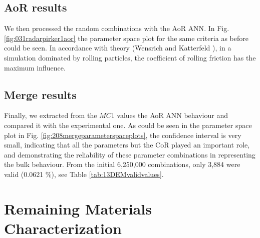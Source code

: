 % 
% 
% 
% 
% 

\subsection{AoR results}
\label{subsec:aorresults}

We then processed the random combinations with the \acs{AoR} \acs{ANN}. In Fig.
\ref{fig:031radarpirker1aor} the parameter space plot for the same criteria as
before could be seen.
In accordance with theory (Wensrich and Katterfeld \cite{RefWorks:87}), in a simulation dominated
by rolling particles, the coefficient of rolling friction has the maximum
influence. \\

% 

\subsection{Merge results}
\label{subsec:mergeresults}

Finally, we extracted from the $MC1$ values the \acs{AoR} \acs{ANN} behaviour
and compared it with the experimental one.
As could be seen in the parameter space plot in Fig.
\ref{fig:208mergeparameterspaceplots}, the confidence interval is very small,
indicating that all the parameters but the \acs{CoR} played an important role, 
and demonstrating the reliability of these parameter
combinations in representing the bulk behaviour.
From the initial 6,250,000 combinations, only 3,884 were valid (0.0621
\%), see Table \ref{tab:13DEMvalidvalues}.






\section{Remaining Materials Characterization}
\label{sec:remainingmaterialscharacterization}


